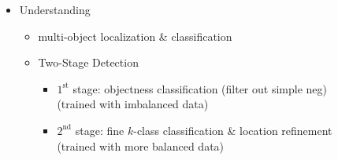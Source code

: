 \begin{itemize}
\item Understanding
	\begin{itemize}
	\item multi-object localization \& classification
	\item Two-Stage Detection
		\begin{itemize}
		\item $1^\text{st}$ stage: objectness classification (filter out simple neg) \\
		(trained with imbalanced data)
		\item $2^\text{nd}$ stage: fine $k$-class classification \& location refinement \\
		(trained with more balanced data)
		\end{itemize}
	\end{itemize}
\end{itemize}

